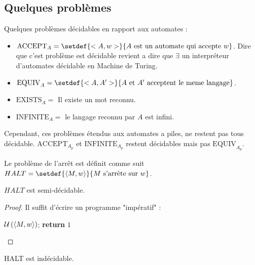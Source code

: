 \subsection{Quelques problèmes}

Quelques problèmes décidables en rapport aux automates :

\begin{itemize}
	\item $\text{ACCEPT}_A = \setdef {<A,w>} {A \text { est un automate qui accepte } w}$.
	      Dire que c'est problème est décidable revient a dire que $\exists$ un interpréteur d'automates décidable en Machine de Turing.
	\item $\text{EQUIV}_A = \setdef {<A,A'>} {A \text { et } A' \text{ acceptent le meme langage}}$.
	\item $\text{EXISTS}_A = $ Il existe un mot reconnu.
	\item $\text{INFINITE}_A = $ le langage reconnu par $A$ est infini.
\end{itemize}

Cependant, ces problèmes étendus aux automates a piles, ne restent pas tous décidable.
$\text{ACCEPT}_{A_p}$ et $\text{INFINITE}_{A_p}$ restent décidables mais pas $\text{EQUIV}_{A_p}$.

\begin{definition}
	Le problème de l'arrêt est définit comme suit $HALT = \setdef {\encode{M,w}} {M \text{ s'arrête sur } w}$.
\end{definition}

\begin{prop}
	$HALT$ est semi-décidable.
\end{prop}

\begin{proof}
	Il suffit d'écrire un programme "impératif" :

	\begin{algorithmic}[lines]
		\State $\mathcal U \left(\left\langle M,w\right\rangle\right)$;
		\State \textbf{return} $1$
		\EndFunction
	\end{algorithmic}
\end{proof}

\begin{prop}
	HALT est indécidable.
\end{prop}

